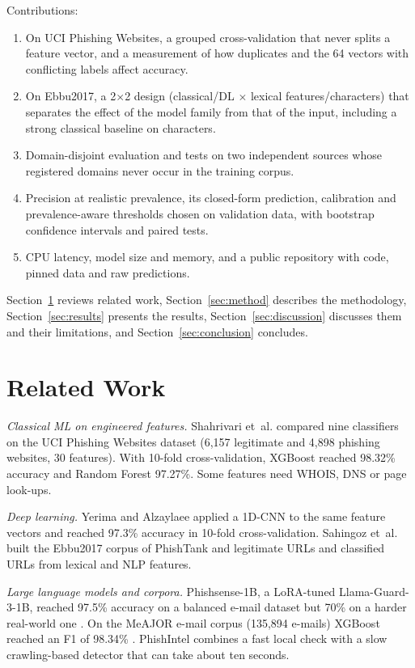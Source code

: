 \documentclass[conference]{IEEEtran}
\begin{document}
Contributions:
\begin{enumerate}
\item On UCI Phishing Websites, a grouped cross-validation that never splits a feature vector, and a measurement of how duplicates and the 64 vectors with conflicting labels affect accuracy.
\item On Ebbu2017, a 2$\times$2 design (classical/DL $\times$ lexical features/characters) that separates the effect of the model family from that of the input, including a strong classical baseline on characters.
\item Domain-disjoint evaluation and tests on two independent sources whose registered domains never occur in the training corpus.
\item Precision at realistic prevalence, its closed-form prediction, calibration and prevalence-aware thresholds chosen on validation data, with bootstrap confidence intervals and paired tests.
\item CPU latency, model size and memory, and a public repository with code, pinned data and raw predictions.
\end{enumerate}

Section~\ref{sec:related} reviews related work, Section~\ref{sec:method} describes the methodology, Section~\ref{sec:results} presents the results, Section~\ref{sec:discussion} discusses them and their limitations, and Section~\ref{sec:conclusion} concludes.

\section{Related Work}\label{sec:related}

\emph{Classical ML on engineered features.} Shahrivari et~al. \cite{shahrivari2020} compared nine classifiers on the UCI Phishing Websites dataset \cite{uci2012} (6,157 legitimate and 4,898 phishing websites, 30 features). With 10-fold cross-validation, XGBoost reached 98.32\% accuracy and Random Forest 97.27\%. Some features need WHOIS, DNS or page look-ups.

\emph{Deep learning.} Yerima and Alzaylaee \cite{yerima2020} applied a 1D-CNN to the same feature vectors and reached 97.3\% accuracy in 10-fold cross-validation. Sahingoz et~al. \cite{sahingoz2019} built the Ebbu2017 corpus of PhishTank and legitimate URLs and classified URLs from lexical and NLP features.

\emph{Large language models and corpora.} Phishsense-1B, a LoRA-tuned Llama-Guard-3-1B, reached 97.5\% accuracy on a balanced e-mail dataset but 70\% on a harder real-world one \cite{blake2025}. On the MeAJOR e-mail corpus (135,894 e-mails) XGBoost reached an F1 of 98.34\% \cite{mendes2025}. PhishIntel \cite{li2024} combines a fast local check with a slow crawling-based detector that can take about ten seconds.
\end{document}
